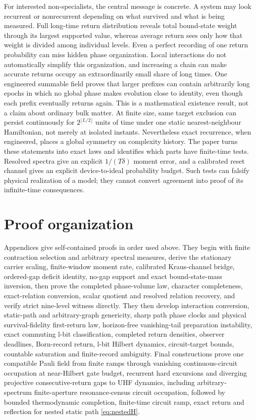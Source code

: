 For interested non-specialists, the central message is concrete.  A system may
look recurrent or nonrecurrent depending on what survived and what is being
measured.  Full long-time return distribution reveals total bound-state
weight through its largest supported value, whereas average return sees only
how that weight is divided among individual levels.  Even a perfect recording of one return probability can miss hidden
phase organization.  Local interactions do not automatically simplify this
organization, and increasing a chain can make accurate returns occupy an
extraordinarily small share of long times.  One engineered summable field
proves that larger prefixes can contain arbitrarily long epochs in which no
global phase makes evolution close to identity, even though each prefix
eventually returns again.  This is a mathematical existence result, not a
claim about ordinary bulk matter.  At finite size, same target exclusion can
persist continuously for $2^{\lfloor L/2\rfloor}$ units of time under one
static nearest-neighbour Hamiltonian, not merely at isolated instants.
Nevertheless exact recurrence,
when engineered, places a global symmetry on complexity history.  The paper turns
these statements into exact laws and identifies which parts have finite-time
tests.  Resolved spectra give an explicit $1/(T\delta)$ moment error, and a
calibrated reset channel gives an explicit device-to-ideal probability
budget.  Such tests can falsify physical realization of a model; they cannot
convert agreement into proof of its infinite-time consequences.

\section{Proof organization}

Appendices give self-contained proofs in order used above.  They begin with
finite contraction selection and arbitrary spectral measures, derive the
stationary carrier scaling, finite-window moment rate, calibrated Kraus-channel
bridge, ordered-gap deficit identity, no-gap support and exact bound-state-mass
inversion, then prove the completed phase-volume law,
character completeness, exact-relation conversion, scalar quotient and
resolved relation recovery, and verify strict nine-level witness directly.
They then develop interaction conversion, static-path and arbitrary-graph
genericity, sharp path phase clocks and physical survival-fidelity
first-return law, horizon-free vanishing-tail preparation instability,
exact commuting l-bit
classification, completed return densities, observer deadlines, Born-record
return, l-bit Hilbert dynamics, circuit-target bounds, countable saturation
and finite-record ambiguity.  Final constructions prove one compatible Pauli
field from finite ramps through vanishing continuous-circuit occupation at
near-Hilbert gate budget,
recurrent hard excursions and diverging projective consecutive-return gaps to UHF dynamics,
including arbitrary-spectrum finite-aperture resonance-census circuit
occupation, followed by
bounded thermodynamic completion, finite-time circuit ramp, exact
return and reflection for nested static path \eqref{eq:nestedH}.
